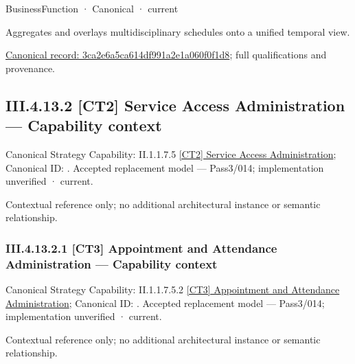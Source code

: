 \label{navigation:III.4.13.1.2.3.2.1}

\label{element:3ca2e6a5ca614df991a2e1a060f0f1d8}
{\small BusinessFunction · Canonical · current}\par

Aggregates and overlays multidisciplinary schedules onto a unified temporal view.


{\footnotesize \href{../../../../../../../../continuum/business/business-function/3ca2e6a5ca614df991a2e1a060f0f1d8.md}{Canonical record: 3ca2e6a5ca614df991a2e1a060f0f1d8}; full qualifications and provenance.}\par
\subsection*{III.4.13.2 [CT2] Service Access Administration — Capability context}
\label{navigation:III.4.13.2}

{\small Canonical Strategy Capability: II.1.1.7.5 \hyperref[element:ba82c985e20a4f9382e7e265a19e440e]{[CT2] Service Access Administration}; Canonical ID: \texttt{}. Accepted replacement model — Pass3/014; implementation unverified · current.}\par
Contextual reference only; no additional architectural instance or semantic relationship.\par
\subsubsection*{III.4.13.2.1 [CT3] Appointment and Attendance Administration — Capability context}
\label{navigation:III.4.13.2.1}

{\small Canonical Strategy Capability: II.1.1.7.5.2 \hyperref[element:cd330c1c71f14310a765d0cb46e6f208]{[CT3] Appointment and Attendance Administration}; Canonical ID: \texttt{}. Accepted replacement model — Pass3/014; implementation unverified · current.}\par
Contextual reference only; no additional architectural instance or semantic relationship.\par
